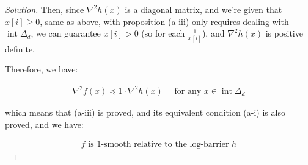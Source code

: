 \documentclass{article}
\newenvironment{solution}
  {\renewcommand\qedsymbol{$\blacksquare$}\begin{proof}[Solution]}
  {\end{proof}}
\DeclareMathOperator{\interior}{int}
\begin{document}
\begin{solution}





Then, since $\nabla^2 h(x)$ is a diagonal matrix, and we're given that $x[i] \geq 0$,
same as above, with proposition (a-iii) only requires dealing with $\interior \Delta_d$,
we can guarantee $x[i] > 0$ (so for each $\frac{1}{x[i]}$), and $\nabla^2 h(x)$ is positive definite.
\bigskip

Therefore, we have:

\begin{align*}
    \nabla^2 f(x) \preceq 1 \cdot \nabla^2 h(x) \quad \text{ for any } x \in \interior \Delta_d
\end{align*}

which means that (a-iii) is proved, 
and its equivalent condition (a-i) is also proved, and we have:

\begin{align*}
    f \text{ is } 1\text{-smooth relative to the log-barrier } h
\end{align*}





\end{solution}
\end{document}
